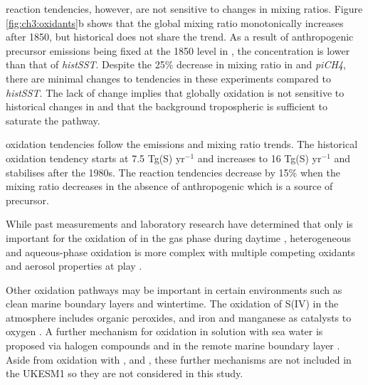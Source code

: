  reaction tendencies, however, are not sensitive to changes in  mixing ratios. Figure \ref{fig:ch3:oxidants}b shows that the global  mixing ratio monotonically increases after 1850, but historical  does not share the trend. As a result of anthropogenic  precursor emissions being fixed at the 1850 level in \sstpio{}, the  concentration is lower than that of \textit{histSST}. Despite the 25\% decrease in  mixing ratio in \sstpio{} and \textit{piCH4}, there are minimal changes to  tendencies in these experiments compared to \textit{histSST}. The lack of change implies that globally  oxidation is not sensitive to historical changes in  and that the background tropospheric  is sufficient to saturate the pathway. 

 oxidation tendencies follow the  emissions and  mixing ratio trends. The historical oxidation tendency starts at 7.5 Tg(S) yr$^{-1}$ and increases to 16 Tg(S) yr$^{-1}$ and stabilises after the 1980s. The  reaction tendencies decrease by 15\% when the  mixing ratio decreases in the absence of anthropogenic  which is a source of  precursor. 


While past measurements and laboratory research have determined that only  is important for the oxidation of  in the gas phase during daytime \citep[][and reference therein]{rattiganUptakeGasphaseSO22000, eatoughConversionSO2Sulfate1994}, heterogeneous and aqueous-phase oxidation is more complex with multiple competing oxidants and aerosol properties at play \citep{pattantyusReviewSulfurDioxide2018, seinfeldAtmosphericChemistryPhysics2016}. 

Other  oxidation pathways may be important in certain environments such as clean marine boundary layers and wintertime. The oxidation of S(IV) in the atmosphere includes organic peroxides, and iron and manganese as catalysts to oxygen \citet{alexanderTransitionMetalcatalyzedOxidation2009, seinfeldAtmosphericChemistryPhysics2016}. A further mechanism for  oxidation in solution with sea water is proposed via halogen compounds  and  in the remote marine boundary layer \citep{vogtMechanismHalogenRelease1996}. Aside from oxidation with ,  and , these further mechanisms are not included in the UKESM1 so they are not considered in this study. 




